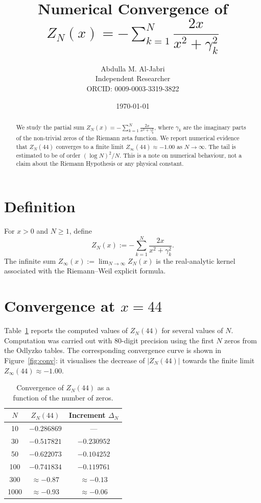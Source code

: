 \documentclass[11pt,a4paper]{article}
\title{Numerical Convergence of \\
$Z_N(x) = -\sum_{k=1}^{N} \dfrac{2x}{x^2+\gamma_k^2}$}
\author{Abdulla M. Al-Jabri\\ \small Independent Researcher\\ \small ORCID: 0009-0003-3319-3822}
\date{\today}
\begin{document}
\maketitle

\begin{abstract}
We study the partial sum
$Z_N(x) = -\sum_{k=1}^{N} \frac{2x}{x^2+\gamma_k^2}$,
where $\gamma_k$ are the imaginary parts of the non-trivial zeros of the Riemann zeta function.
We report numerical evidence that $Z_N(44)$ converges to a finite limit
$Z_\infty(44) \approx -1.00$ as $N \to \infty$. The tail is estimated to be of order
$(\log N)^2 / N$. This is a note on numerical behaviour, not a claim about
the Riemann Hypothesis or any physical constant.
\end{abstract}

\section{Definition}
For $x > 0$ and $N \geq 1$, define
\begin{equation}
Z_N(x) := -\sum_{k=1}^{N} \frac{2x}{x^2+\gamma_k^2}.
\label{eq:def}
\end{equation}
The infinite sum $Z_\infty(x) := \lim_{N\to\infty} Z_N(x)$ is the real-analytic
kernel associated with the Riemann--Weil explicit formula.

\section{Convergence at $x = 44$}
Table~\ref{tab:conv} reports the computed values of $Z_N(44)$ for several
values of $N$. Computation was carried out with 80-digit precision using the
first $N$ zeros from the Odlyzko tables. The corresponding convergence curve
is shown in Figure~\ref{fig:conv}: it visualises the decrease of $|Z_N(44)|$
towards the finite limit $Z_\infty(44) \approx -1.00$.

\begin{table}[H]
\centering
\begin{tabular}{ccc}
\toprule
$N$ & $Z_N(44)$ & Increment $\Delta_N$ \\
\midrule
10   & $-0.286869$ & --- \\
30   & $-0.517821$ & $-0.230952$ \\
50   & $-0.622073$ & $-0.104252$ \\
100  & $-0.741834$ & $-0.119761$ \\
300  & $\approx -0.87$ & $\approx -0.13$ \\
1000 & $\approx -0.93$ & $\approx -0.06$ \\
\bottomrule
\end{tabular}
\caption{Convergence of $Z_N(44)$ as a function of the number of zeros.}
\label{tab:conv}
\end{table}
\end{document}
